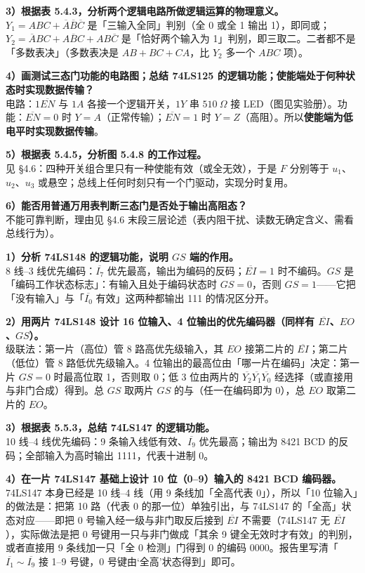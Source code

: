 \documentclass[11pt]{ctexart}
\let\origsubhdr\subhdr
\renewcommand{\subhdr}[1]{\needspace{3\baselineskip}\origsubhdr{#1}}
\begin{document}
\textbf{3）根据表 5.4.3，分析两个逻辑电路所做逻辑运算的物理意义。}\\
$Y_1=ABC+\overline{A}\overline{B}\overline{C}$ 是「三输入全同」判别（全 0 或全 1 输出 1），即同或；$Y_2=\overline{A}BC+A\overline{B}C+AB\overline{C}$ 是「恰好两个输入为 1」判别，即三取二。二者都不是「多数表决」（多数表决是 $AB+BC+CA$，比 $Y_2$ 多一个 $ABC$ 项）。

\textbf{4）画测试三态门功能的电路图；总结 74LS125 的逻辑功能；使能端处于何种状态时实现数据传输？}\\
电路：$1\overline{EN}$ 与 $1A$ 各接一个逻辑开关，$1Y$ 串 $510\ \Omega$ 接 LED（图见实验册）。功能：$\overline{EN}=0$ 时 $Y=A$（正常传输）；$\overline{EN}=1$ 时 $Y=Z$（高阻）。所以\textbf{使能端为低电平时实现数据传输}。

\textbf{5）根据表 5.4.5，分析图 5.4.8 的工作过程。}\\
见 §4.6：四种开关组合里只有一种使能有效（或全无效），于是 $F$ 分别等于 $u_1$、$u_2$、$u_3$ 或悬空；总线上任何时刻只有一个门驱动，实现分时复用。

\textbf{6）能否用普通万用表判断三态门是否处于输出高阻态？}\\
不能可靠判断，理由见 §4.6 末段三层论述（表内阻干扰、读数无确定含义、需看总线行为）。


\textbf{1）分析 74LS148 的逻辑功能，说明 $GS$ 端的作用。}\\
8 线--3 线优先编码：$\overline{I_7}$ 优先最高，输出为编码的反码；$\overline{EI}=1$ 时不编码。$GS$ 是「编码工作状态标志」：有输入且处于编码状态时 $GS=0$，否则 $GS=1$——它把「没有输入」与「$\overline{I_0}$ 有效」这两种都输出 111 的情况区分开。

\textbf{2）用两片 74LS148 设计 16 位输入、4 位输出的优先编码器（同样有 $\overline{EI}$、$EO$、$GS$）。}\\
级联法：第一片（高位）管 8 路高优先级输入，其 $EO$ 接第二片的 $\overline{EI}$；第二片（低位）管 8 路低优先级输入。4 位输出的最高位由「哪一片在编码」决定：第一片 $GS=0$ 时最高位取 1，否则取 0；低 3 位由两片的 $\overline{Y_2}\overline{Y_1}\overline{Y_0}$ 经选择（或直接用与非门合成）得到。总 $GS$ 取两片 $GS$ 的与（任一在编码即为 0），总 $EO$ 取第二片的 $EO$。

\textbf{3）根据表 5.5.3，总结 74LS147 的逻辑功能。}\\
10 线--4 线优先编码：9 条输入线低有效、$\overline{I_9}$ 优先最高；输出为 8421 BCD 的反码；全部输入为高时输出 1111，代表十进制 0。

\textbf{4）在一片 74LS147 基础上设计 10 位（0--9）输入的 8421 BCD 编码器。}\\
74LS147 本身已经是 10 线--4 线（用 9 条线加「全高代表 0」），所以「10 位输入」的做法是：把第 10 路（代表 0 的那一位）单独引出，与 74LS147 的「全高」状态对应——即把 0 号输入经一级与非门取反后接到 $\overline{EI}$ 不需要（74LS147 无 $\overline{EI}$），实际做法是把 0 号键用一只与非门做成「其余 9 键全无效时才有效」的判别，或者直接用 9 条线加一只「全 0 检测」门得到 0 的编码 0000。报告里写清「$\overline{I_1}\sim\overline{I_9}$ 接 1--9 号键，0 号键由‘全高’状态得到」即可。
\end{document}

